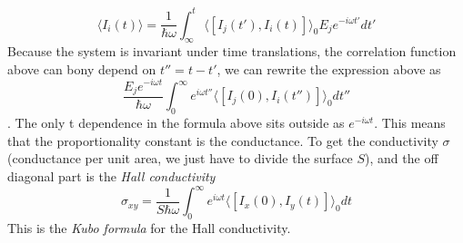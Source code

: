 \begin{equation}
    \langle I_i(t)\rangle=\frac 1{\hbar\omega}\int_{\infty}^t
    \langle[I_j(t'),I_i(t)]\rangle_0 E_je^{-i\omega t'}dt'
\end{equation}
Because the system is invariant under time translations, the correlation function above can bony depend on $t''=t-t'$, we can rewrite the expression above as
\begin{equation}
    \frac{E_je^{-i\omega t}}{\hbar \omega}\int_0^{\infty}e^{i\omega t''} \langle[I_j(0),I_i(t'')]\rangle_0 dt''
\end{equation}.
The only t dependence in the formula above sits outside as $e^{-i\omega t}$. This means that the proportionality constant is the conductance. To get the conductivity $\sigma$ (conductance per unit area, we just have to divide the surface $S$), and the off diagonal part is the \textit{Hall conductivity}
\begin{equation}
    \sigma_{xy}=\frac 1{S\hbar \omega}\int_0^{\infty}e^{i\omega t} \langle[I_x(0),I_y(t)]\rangle_0 dt
    \label{eq:kubo}
\end{equation}
This is the \textit{Kubo formula} for the Hall conductivity.














